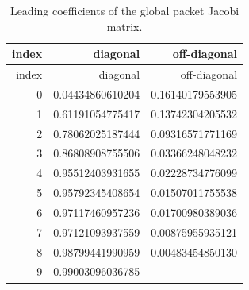\begin{longtable}{rrr}
\caption{Leading coefficients of the global packet Jacobi matrix.}\label{tab:jacobi}\\
\toprule
index & diagonal & off-diagonal\\
\midrule
\endfirsthead
\toprule
index & diagonal & off-diagonal\\
\midrule
\endhead
0 & 0.04434860610204 & 0.16140179553905 \\
1 & 0.61191054775417 & 0.13742304205532 \\
2 & 0.78062025187444 & 0.09316571771169 \\
3 & 0.86808908755506 & 0.03366248048232 \\
4 & 0.95512403931655 & 0.02228734776099 \\
5 & 0.95792345408654 & 0.01507011755538 \\
6 & 0.97117460957236 & 0.01700980389036 \\
7 & 0.97121093937559 & 0.00875955935121 \\
8 & 0.98799441990959 & 0.00483454850130 \\
9 & 0.99003096036785 & - \\
\bottomrule
\end{longtable}
